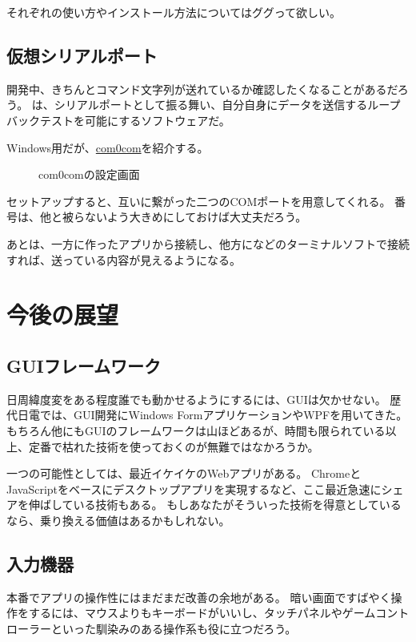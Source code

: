 \documentclass[letterpaper,10pt,dvipdfmx]{sphinxmanual}
\begin{document}
それぞれの使い方やインストール方法についてはググって欲しい。


\subsection{仮想シリアルポート}
\label{\detokenize{nissyu-idohen/pc-software:id8}}
開発中、きちんとコマンド文字列が送れているか確認したくなることがあるだろう。
は、シリアルポートとして振る舞い、自分自身にデータを送信するループバックテストを可能にするソフトウェアだ。

Windows用だが、\href{https://sourceforge.net/projects/com0com/}{com0com}を紹介する。
\begin{figure}[htbp]
\centering
\capstart

\noindent{}
\caption{com0comの設定画面}\label{\detokenize{nissyu-idohen/pc-software:id13}}\end{figure}

セットアップすると、互いに繋がった二つのCOMポートを用意してくれる。
番号は、他と被らないよう大きめにしておけば大丈夫だろう。

あとは、一方に作ったアプリから接続し、他方になどのターミナルソフトで接続すれば、送っている内容が見えるようになる。


\section{今後の展望}
\label{\detokenize{nissyu-idohen/pc-software:id9}}

\subsection{GUIフレームワーク}
\label{\detokenize{nissyu-idohen/pc-software:gui}}
日周緯度変をある程度誰でも動かせるようにするには、GUIは欠かせない。
歴代日電では、GUI開発にWindows FormアプリケーションやWPFを用いてきた。
もちろん他にもGUIのフレームワークは山ほどあるが、時間も限られている以上、定番で枯れた技術を使っておくのが無難ではなかろうか。

一つの可能性としては、最近イケイケのWebアプリがある。
ChromeとJavaScriptをベースにデスクトップアプリを実現するなど、ここ最近急速にシェアを伸ばしている技術もある。
もしあなたがそういった技術を得意としているなら、乗り換える価値はあるかもしれない。


\subsection{入力機器}
\label{\detokenize{nissyu-idohen/pc-software:id10}}
本番でアプリの操作性にはまだまだ改善の余地がある。
暗い画面ですばやく操作をするには、マウスよりもキーボードがいいし、タッチパネルやゲームコントローラーといった馴染みのある操作系も役に立つだろう。
\end{document}
